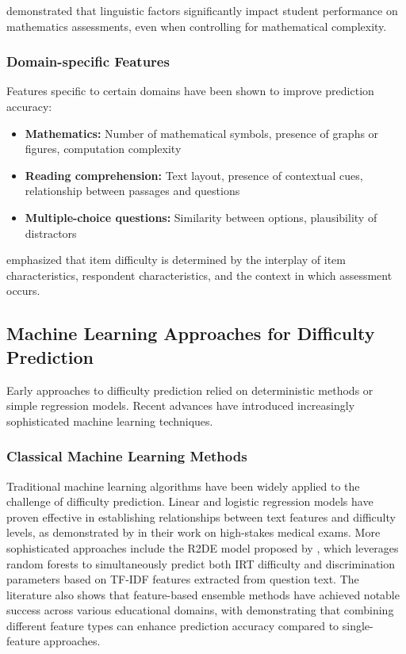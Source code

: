 \documentclass[
    a4paper, %
    10pt, %
    twoside, %
]{LTJournalArticle}
\begin{document}
\textcite{hickendorff2013} demonstrated that linguistic factors significantly impact student performance on mathematics assessments, even when controlling for mathematical complexity.

\subsubsection{Domain-specific Features}

Features specific to certain domains have been shown to improve prediction accuracy:

\begin{itemize}
    \item \textbf{Mathematics:} Number of mathematical symbols, presence of graphs or figures, computation complexity \cite{benedetto2020r2de}
    \item \textbf{Reading comprehension:} Text layout, presence of contextual cues, relationship between passages and questions \cite{lawrence2022reading}
    \item \textbf{Multiple-choice questions:} Similarity between options, plausibility of distractors \cite{kurdi2016experimental, yaneva2018automatic}
\end{itemize}

\textcite{toyama2021makes} emphasized that item difficulty is determined by the interplay of item characteristics, respondent characteristics, and the context in which assessment occurs.

\subsection{Machine Learning Approaches for Difficulty Prediction}

Early approaches to difficulty prediction relied on deterministic methods or simple regression models. Recent advances have introduced increasingly sophisticated machine learning techniques.

\subsubsection{Classical Machine Learning Methods}

Traditional machine learning algorithms have been widely applied to the challenge of difficulty prediction. Linear and logistic regression models have proven effective in establishing relationships between text features and difficulty levels, as demonstrated by \textcite{yaneva2019predicting} in their work on high-stakes medical exams. More sophisticated approaches include the R2DE model proposed by \textcite{benedetto2020r2de}, which leverages random forests to simultaneously predict both IRT difficulty and discrimination parameters based on TF-IDF features extracted from question text. The literature also shows that feature-based ensemble methods have achieved notable success across various educational domains, with \textcite{yaneva2019predicting} demonstrating that combining different feature types can enhance prediction accuracy compared to single-feature approaches.
\end{document}
